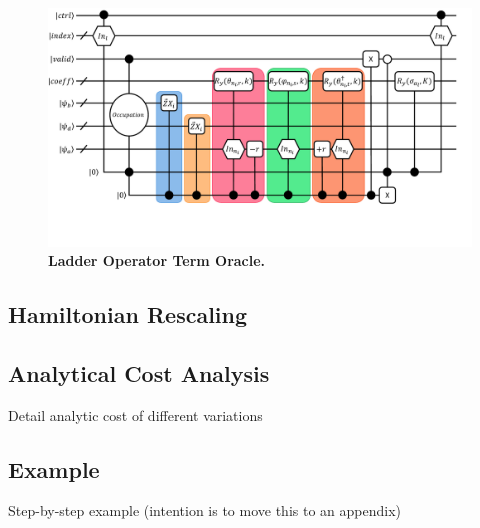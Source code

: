 \begin{figure}
    \centering
    \includegraphics[width=16cm]{figures/applying-term.pdf}
    \caption{\textbf{Ladder Operator Term Oracle.}
    }
    \label{fig:lobe-term}
\end{figure}


\subsection{Hamiltonian Rescaling}
\label{subsec:rescaling}

\subsection{Analytical Cost Analysis}
\label{subsec:analytics}
Detail analytic cost of different variations

\subsection{Example}
\label{subsec:example}
Step-by-step example (intention is to move this to an appendix)
